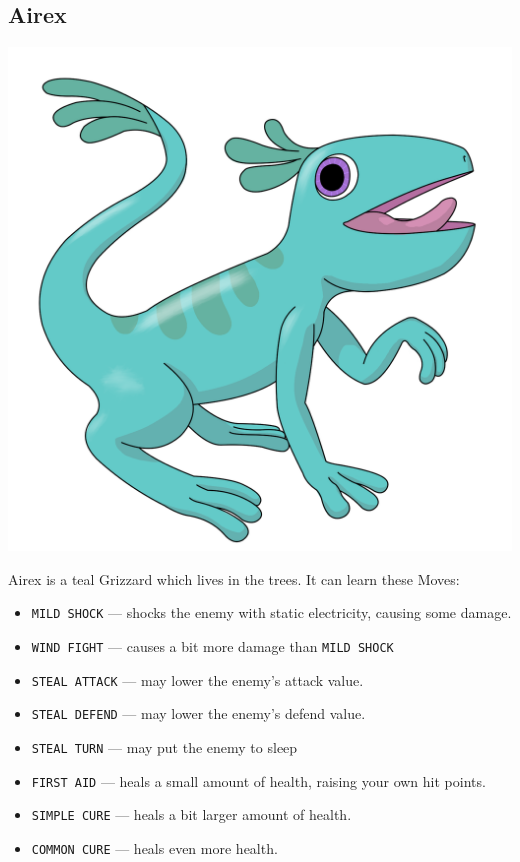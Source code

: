 \documentclass[10pt,twocolumn,openany,article]{memoir}
\begin{document}
\begin{description}
\ifdefined\DEMO\else

\section{Airex}

\includegraphics[width=\columnwidth]{../Manual/Airex.png}

Airex is a teal Grizzard which lives in the trees. It can learn these Moves:

\begin{itemize}
\item \texttt{MILD SHOCK} --- shocks  the enemy with static electricity,
  causing some damage.
\item \texttt{WIND FIGHT} --- causes a bit more damage than \texttt{MILD SHOCK}
\item \texttt{STEAL ATTACK} --- may lower the enemy's attack value.
\item \texttt{STEAL DEFEND} --- may lower the enemy's defend value.
\item \texttt{STEAL TURN} --- may put the enemy to sleep
\item \texttt{FIRST  AID} ---  heals a small  amount of  health, raising
  your own hit points.
\item \texttt{SIMPLE CURE} --- heals a bit larger amount of health.
\item \texttt{COMMON CURE} --- heals even more health.
\end{itemize}


\end{description}
\end{document}
